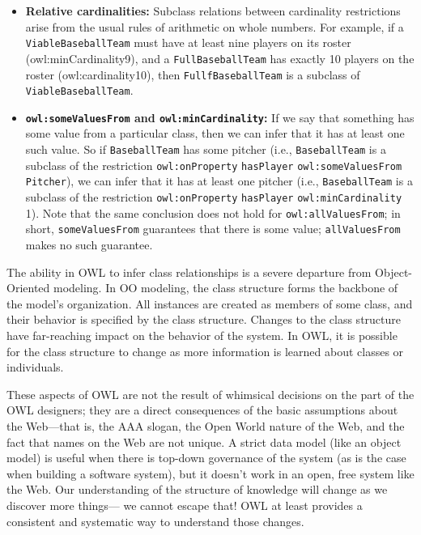 \begin{itemize}
\item \textbf{Relative cardinalities:} Subclass relations between cardinality
restrictions arise from the usual rules of arithmetic on whole numbers.
For example, if a \texttt{ViableBaseballTeam} must have at least nine players on
its roster (owl:minCardinality9), and a \texttt{FullBaseballTeam} has exactly 10
players on the roster (owl:cardinality10), then \texttt{FullfBaseballTeam} is a
subclass of \texttt{ViableBaseballTeam}.

\item \textbf{\texttt{owl:someValuesFrom} and \texttt{owl:minCardinality}:} If we say that something has
some value from a particular class, then we can infer that it has at least
one such value. So if \texttt{BaseballTeam} has some pitcher (i.e., \texttt{BaseballTeam}
is a subclass of the restriction \texttt{owl:onProperty} \texttt{hasPlayer}
\texttt{owl:someValuesFrom} \texttt{Pitcher}), we can infer that it has at least one
pitcher (i.e., \texttt{BaseballTeam} is a subclass of the restriction
\texttt{owl:onProperty} \texttt{hasPlayer} \texttt{owl:minCardinality} 1). Note that the same
conclusion does not hold for \texttt{owl:allValuesFrom}; in short, \texttt{someValuesFrom}
guarantees that there is some value; \texttt{allValuesFrom} makes no such
guarantee.
\end{itemize}

\begin{sidebar}{}
The ability in OWL to infer class relationships is a severe departure
from Object-Oriented modeling. In OO modeling, the class structure forms
the backbone of the model's organization. All instances are created as
members of some class, and their behavior is specified by the class
structure. Changes to the class structure have far-reaching impact on
the behavior of the system. In OWL, it is possible for the class
structure to change as more information is learned about classes or
individuals.


These aspects of OWL are not the result of whimsical decisions on the
part of the OWL designers; they are a direct
consequences of the basic assumptions about the Web---that is, the AAA
slogan, the Open World nature of the Web, and the fact that names on the
Web are not unique. A strict data model (like an object model) is useful
when there is top-down governance of the system (as is the case when
building a software system), but it doesn't work in an open, free system
like the Web. Our understanding of the structure of knowledge will
change as we discover more things--- we cannot escape that! OWL at least
provides a consistent and systematic way to understand those changes.
\end{sidebar}

